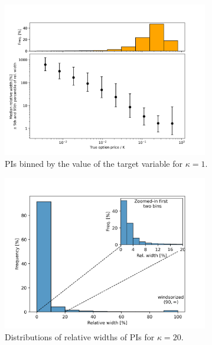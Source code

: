 \documentclass{article}
\theoremstyle{definition}
\begin{document}
\begin{figure}
\centering
\includegraphics[width=0.8\textwidth]{reports/figures/simulated_data/sim_kappa1_rel_widths_to_opt_price.png}
\caption{PIs binned by the value of the target variable for $\kappa=1$.}
\end{figure}


\begin{figure}
\centering
\includegraphics[width=0.8\textwidth]{reports/figures/simulated_data/sim_kappa20_relative_widths.png}
\caption{Distributions of relative widths of PIs for $\kappa=20$.}
\end{figure}
\end{document}
